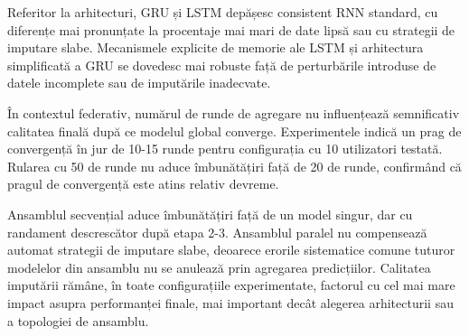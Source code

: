 Referitor la arhitecturi, GRU și LSTM depășesc consistent RNN standard, cu diferențe mai pronunțate la procentaje mai mari de date lipsă sau cu strategii de imputare slabe. Mecanismele explicite de memorie ale LSTM și arhitectura simplificată a GRU se dovedesc mai robuste față de perturbările introduse de datele incomplete sau de imputările inadecvate.

În contextul federativ, numărul de runde de agregare nu influențează semnificativ calitatea finală după ce modelul global converge. Experimentele indică un prag de convergență în jur de 10-15 runde pentru configurația cu 10 utilizatori testată. Rularea cu 50 de runde nu aduce îmbunătățiri față de 20 de runde, confirmând că pragul de convergență este atins relativ devreme.

Ansamblul secvențial aduce îmbunătățiri față de un model singur, dar cu randament descrescător după etapa 2-3. Ansamblul paralel nu compensează automat strategii de imputare slabe, deoarece erorile sistematice comune tuturor modelelor din ansamblu nu se anulează prin agregarea predicțiilor. Calitatea imputării rămâne, în toate configurațiile experimentate, factorul cu cel mai mare impact asupra performanței finale, mai important decât alegerea arhitecturii sau a topologiei de ansamblu.

